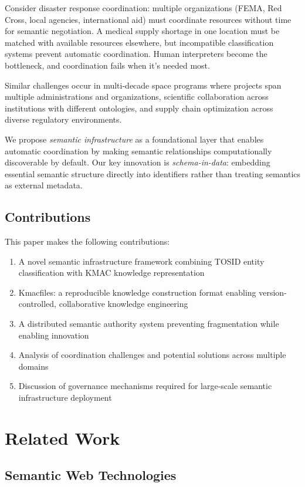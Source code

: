 \documentclass[conference]{IEEEtran}
\begin{document}
Consider disaster response coordination: multiple organizations (FEMA, Red Cross, local agencies, international aid) must coordinate resources without time for semantic negotiation. A medical supply shortage in one location must be matched with available resources elsewhere, but incompatible classification systems prevent automatic coordination. Human interpreters become the bottleneck, and coordination fails when it's needed most.

Similar challenges occur in multi-decade space programs where projects span multiple administrations and organizations, scientific collaboration across institutions with different ontologies, and supply chain optimization across diverse regulatory environments.

We propose \emph{semantic infrastructure} as a foundational layer that enables automatic coordination by making semantic relationships computationally discoverable by default. Our key innovation is \emph{schema-in-data}: embedding essential semantic structure directly into identifiers rather than treating semantics as external metadata.

\subsection{Contributions}

This paper makes the following contributions:

\begin{enumerate}
\item A novel semantic infrastructure framework combining TOSID entity classification with KMAC knowledge representation
\item Kmacfiles: a reproducible knowledge construction format enabling version-controlled, collaborative knowledge engineering
\item A distributed semantic authority system preventing fragmentation while enabling innovation
\item Analysis of coordination challenges and potential solutions across multiple domains
\item Discussion of governance mechanisms required for large-scale semantic infrastructure deployment
\end{enumerate}

\section{Related Work}

\subsection{Semantic Web Technologies}
\end{document}
